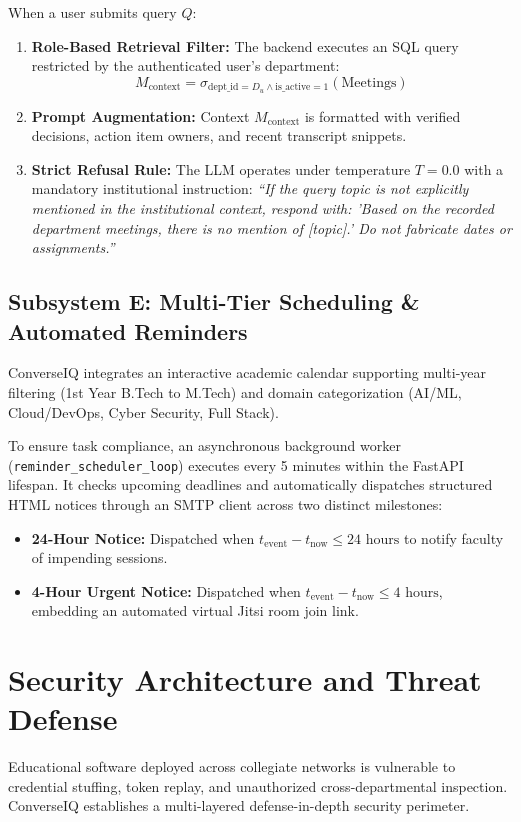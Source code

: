 \documentclass[conference]{IEEEtran}
\begin{document}
When a user submits query $Q$:
\begin{enumerate}
    \item \textbf{Role-Based Retrieval Filter:} The backend executes an SQL query restricted by the authenticated user's department:
    \begin{equation}
    M_{\text{context}} = \sigma_{\text{dept\_id} = D_u \wedge \text{is\_active} = 1}(\text{Meetings})
    \end{equation}
    \item \textbf{Prompt Augmentation:} Context $M_{\text{context}}$ is formatted with verified decisions, action item owners, and recent transcript snippets.
    \item \textbf{Strict Refusal Rule:} The LLM operates under temperature $T=0.0$ with a mandatory institutional instruction: \textit{``If the query topic is not explicitly mentioned in the institutional context, respond with: 'Based on the recorded department meetings, there is no mention of [topic].' Do not fabricate dates or assignments.''}
\end{enumerate}

\subsection{Subsystem E: Multi-Tier Scheduling & Automated Reminders}
ConverseIQ integrates an interactive academic calendar supporting multi-year filtering (1st Year B.Tech to M.Tech) and domain categorization (AI/ML, Cloud/DevOps, Cyber Security, Full Stack).

To ensure task compliance, an asynchronous background worker (\texttt{reminder\_scheduler\_loop}) executes every 5 minutes within the FastAPI lifespan. It checks upcoming deadlines and automatically dispatches structured HTML notices through an SMTP client across two distinct milestones:
\begin{itemize}
    \item \textbf{24-Hour Notice:} Dispatched when $t_{\text{event}} - t_{\text{now}} \le 24\text{ hours}$ to notify faculty of impending sessions.
    \item \textbf{4-Hour Urgent Notice:} Dispatched when $t_{\text{event}} - t_{\text{now}} \le 4\text{ hours}$, embedding an automated virtual Jitsi room join link.
\end{itemize}

\section{Security Architecture and Threat Defense}
Educational software deployed across collegiate networks is vulnerable to credential stuffing, token replay, and unauthorized cross-departmental inspection. ConverseIQ establishes a multi-layered defense-in-depth security perimeter.
\end{document}
